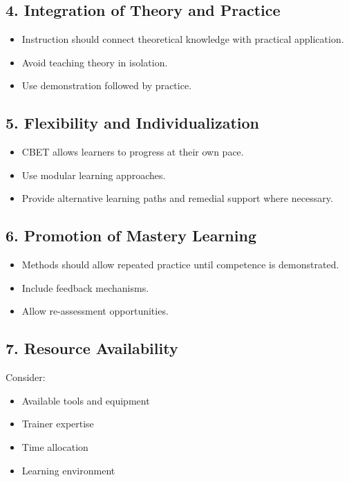 \documentclass[12pt,a4paper]{article}
\begin{document}
\subsection*{4. Integration of Theory and Practice}
\begin{itemize}
    \item Instruction should connect theoretical knowledge with practical application.
    \item Avoid teaching theory in isolation.
    \item Use demonstration followed by practice.
\end{itemize}

\subsection*{5. Flexibility and Individualization}
\begin{itemize}
    \item CBET allows learners to progress at their own pace.
    \item Use modular learning approaches.
    \item Provide alternative learning paths and remedial support where necessary.
\end{itemize}

\subsection*{6. Promotion of Mastery Learning}
\begin{itemize}
    \item Methods should allow repeated practice until competence is demonstrated.
    \item Include feedback mechanisms.
    \item Allow re-assessment opportunities.
\end{itemize}

\subsection*{7. Resource Availability}
Consider:
\begin{itemize}
    \item Available tools and equipment
    \item Trainer expertise
    \item Time allocation
    \item Learning environment
\end{itemize}
\end{document}
